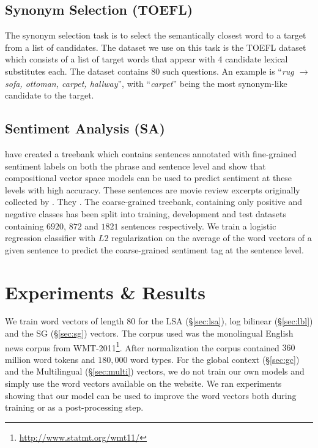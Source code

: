 \documentclass[11pt]{article}
\begin{document}
\subsection{Synonym Selection (TOEFL)}
\label{ref:toefl}

The synonym selection task is to select the semantically closest word to a target from a list of candidates. The dataset we use on this task is the TOEFL dataset \cite{landauer:1997} which consists of a list of target words that appear with 4 candidate lexical substitutes each. The dataset contains 80 such questions. An example is ``\textit{rug $\rightarrow$ sofa, ottoman, carpet, hallway}'', with ``\textit{carpet}'' being the most synonym-like candidate to the target.

\subsection{Sentiment Analysis (SA)}
\label{sec:senti}

 have created a treebank which contains sentences
annotated with fine-grained sentiment labels on both the phrase and sentence level
and show that compositional vector space models can be used to predict sentiment
at these levels with high accuracy.
These sentences are movie review excerpts originally collected by .
They . The coarse-grained treebank, containing only positive and negative 
classes has been split into training, development and test datasets containing $6920$, $872$ and 
$1821$ sentences respectively. We train a logistic regression classifier with $L2$ regularization
on the average of the word 
vectors of a given sentence to predict the coarse-grained sentiment tag at the sentence level.

\section{Experiments \& Results}
\label{sec:expts}

We train word vectors of length $80$ for the LSA (\S\ref{sec:lsa}), log bilinear (\S\ref{sec:lbl}) 
and the SG (\S\ref{sec:sg}) vectors. The corpus used was the monolingual English news corpus from 
WMT-2011\footnote{\url{http://www.statmt.org/wmt11/}}. After normalization the corpus 
contained $360$ million word tokens and $180,000$ word types. For the global context 
(\S\ref{sec:gc}) and the Multilingual (\S\ref{sec:multi}) vectors, we do not train our own models
and simply use the word vectors available on the website.
We ran experiments showing that our model can be used to improve the word vectors both
during training or as a post-processing step.
\end{document}
